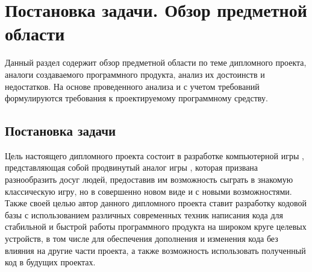 \section{Постановка задачи. Обзор предметной области}

Данный раздел содержит обзор предметной области по теме дипломного проекта, аналоги создаваемого программного продукта, анализ их достоинств и недостатков. На основе проведенного анализа и с учетом требований формулируются требования к проектируемому программному средству.


\subsection{Постановка задачи}

Цель настоящего дипломного проекта состоит в разработке компьютерной игры \BinaryWars, представляющая собой продвинутый аналог игры \TicTacToe, которая призвана разнообразить досуг людей, предоставив им возможность сыграть в знакомую классическую игру, но в совершенно новом виде и с новыми возможностями. Также своей целью автор данного дипломного проекта ставит разработку кодовой базы с использованием различных современных техник написания кода для стабильной и быстрой работы программного продукта на широком круге целевых устройств, в том числе для обеспечения дополнения и изменения кода без влияния на другие части проекта, а также возможность использовать полученный код в будущих проектах.

